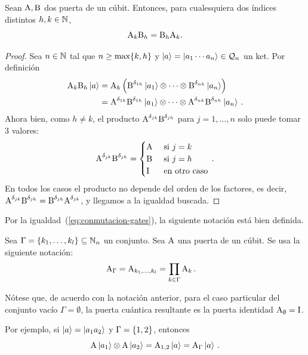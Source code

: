 \begin{proposition}
  Sean $\text{A}, \text{B}$ dos puerta de un cúbit.
  Entonces, para cualesquiera dos índices distintos $h,k \in \mathbb{N}$,
  \begin{equation}
    \label{eq:conmutacion-gates}
    \text{A}_k\text{B}_{h} = \text{B}_h\text{A}_{k}.
  \end{equation}
\end{proposition}
\begin{proof}
  Sea $n\in\mathbb{N}$ tal que $n\geq\max\{k, h\}$ y $\ket{a}=\ket{a_1\cdots a_n}\in\mathcal{Q}_n$ un ket.
  Por definición
  \begin{align*}
    \text{A}_k\text{B}_{h}\ket{a}
     & =  \text{A}_{k}\left(\text{B}^{\delta_{1h}}\ket{a_1}\otimes\cdots\otimes\text{B}^{\delta_{nh}}\ket{a_n}\right)                       \\
     & =  \text{A}^{\delta_{1k}}\text{B}^{\delta_{1h}}\ket{a_1}\otimes\cdots\otimes\text{A}^{\delta_{nk}}\text{B}^{\delta_{nh}}\ket{a_n}\,.
  \end{align*}
  Ahora bien, como $h\neq k$, el producto $\text{A}^{\delta_{jk}}\text{B}^{\delta_{jh}}$ para $j=1,\dots,n$ solo puede tomar 3 valores:
  \[
    \text{A}^{\delta_{jk}}\text{B}^{\delta_{jh}} = \begin{cases}
      \text{A} & \text{ si } j = k    \\
      \text{B} & \text{ si } j = h    \\
      \text{I} & \text{ en otro caso}
    \end{cases}\,.
  \]
  En todos los casos el producto no depende del orden de los factores, es decir, $\text{A}^{\delta_{jk}}\text{B}^{\delta_{jh}}=\text{B}^{\delta_{jh}}\text{A}^{\delta_{jk}}$, y llegamos a la igualdad buscada.
\end{proof}

Por la igualdad~(\ref{eq:conmutacion-gates}), la siguiente notación está bien definida.
\begin{notation}
  Sea $\Gamma=\{k_1,\dots,k_l\}\subseteq\mathbb{N}_n$ un conjunto.
  Sea $\text{A}$ una puerta de un cúbit. Se usa la siguiente notación:
  \begin{align}
    \text{A}_{\Gamma} & = \text{A}_{k_1,\dots,k_l}=\prod_{k\in\Gamma}\text{A}_k\,.
  \end{align}
\end{notation}

Nótese que, de acuerdo con la notación anterior, para el caso particular del conjunto vacío $\Gamma=\emptyset$, la puerta cuántica resultante es la puerta identidad $\text{A}_\emptyset=\text{I}$.

Por ejemplo, si $\ket{a}=\ket{a_1 a_2}$ y $\Gamma = \{1,2\}$, entonces
\[
  \text{A}\ket{a_1}\otimes \text{A}\ket{a_2} = \text{A}_{1,2}\ket{a}=\text{A}_{\Gamma}\ket{a}\,.
\]
